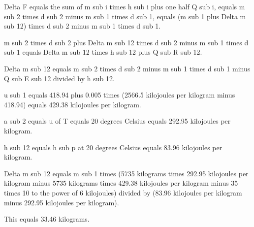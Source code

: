 Delta F equals the sum of m sub i times h sub i plus one half Q sub i, equals m sub 2 times d sub 2 minus m sub 1 times d sub 1, equals (m sub 1 plus Delta m sub 12) times d sub 2 minus m sub 1 times d sub 1.

m sub 2 times d sub 2 plus Delta m sub 12 times d sub 2 minus m sub 1 times d sub 1 equals Delta m sub 12 times h sub 12 plus Q sub R sub 12.

Delta m sub 12 equals m sub 2 times d sub 2 minus m sub 1 times d sub 1 minus Q sub E sub 12 divided by h sub 12.

u sub 1 equals 418.94 plus 0.005 times (2566.5 kilojoules per kilogram minus 418.94) equals 429.38 kilojoules per kilogram.

a sub 2 equals u of T equals 20 degrees Celsius equals 292.95 kilojoules per kilogram.

h sub 12 equals h sub p at 20 degrees Celsius equals 83.96 kilojoules per kilogram.

Delta m sub 12 equals m sub 1 times (5735 kilograms times 292.95 kilojoules per kilogram minus 5735 kilograms times 429.38 kilojoules per kilogram minus 35 times 10 to the power of 6 kilojoules) divided by (83.96 kilojoules per kilogram minus 292.95 kilojoules per kilogram).

This equals 33.46 kilograms.